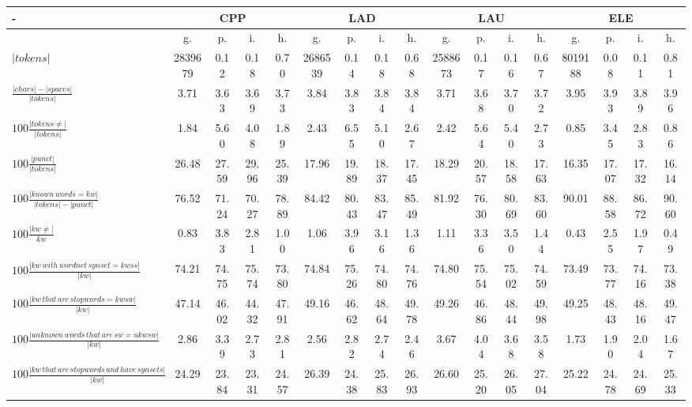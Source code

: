 \documentclass[%
 aip,
 jmp,%
 amsmath,amssymb,
 reprint,%
]{revtex4-1}
\begin{document}
\begin{table}
  \centering
    \footnotesize
\setlength{\tabcolsep}{.056667em}
  \begin{tabular}{|l|| c|c|c|c||  c|c|c|c||   c|c|c|c||   c|c|c|c|}\hline
-\-  & \multicolumn{4}{c|}{CPP} & \multicolumn{4}{c|}{LAD} & \multicolumn{4}{c|}{LAU} & \multicolumn{4}{c|}{ELE} \\ \hline
 & g. & p. & i. & h. &     g. & p. & i. & h. &    g. & p. & i. & h. &    g. & p. & i. & h. \\\hline
$|tokens|$ & 2839679  & 0.12 & 0.18 & 0.70 & 2686539  & 0.14 & 0.18 & 0.68 & 2588673  & 0.17 & 0.16 & 0.67 & 8019188  & 0.08 & 0.11 & 0.81 \\\hline
$\frac{|chars|-|spaces|}{|tokens|}$ & 3.71 & 3.63 & 3.69 & 3.73 & 3.84 & 3.83 & 3.84 & 3.84 & 3.71 & 3.68 & 3.70 & 3.72 & 3.95 & 3.93 & 3.89 & 3.96 \\\hline
$100\frac{|tokens \neq|}{|tokens|}$ & 1.84 & 5.60 & 4.08 & 1.89 & 2.43 & 6.55 & 5.10 & 2.67 & 2.42 & 5.64 & 5.40 & 2.73 & 0.85 & 3.45 & 2.83 & 0.86 \\\hline
$100\frac{|punct|}{|tokens|}$ & 26.48 & 27.59 & 29.96 & 25.39 & 17.96 & 19.89 & 18.37 & 17.45 & 18.29 & 20.57 & 18.58 & 17.63 & 16.35 & 17.07 & 17.32 & 16.14 \\\hline
$100\frac{|known\,words=kw|}{|tokens| - |punct|}$ & 76.52 & 71.24 & 70.27 & 78.89 & 84.42 & 80.43 & 83.47 & 85.49 & 81.92 & 76.30 & 80.69 & 83.60 & 90.01 & 88.58 & 86.72 & 90.60 \\\hline
$100\frac{|kw\neq|}{kw}$ & 0.83 & 3.83 & 2.81 & 1.00 & 1.06 & 3.96 & 3.16 & 1.36 & 1.11 & 3.36 & 3.50 & 1.44 & 0.43 & 2.55 & 1.97 & 0.49 \\\hline
$100\frac{|kw\,with\,wordnet\,synset=kwss|}{|kw|}$ & 74.21 & 74.75 & 75.74 & 73.80 & 74.84 & 75.26 & 74.80 & 74.76 & 74.80 & 75.54 & 75.02 & 74.59 & 73.49 & 73.77 & 74.16 & 73.38 \\\hline
100$\frac{|kw\,that\,are\,stopwords=kwsw|}{|kw|}$ & 47.14 & 46.02 & 44.32 & 47.91 & 49.16 & 46.62 & 48.64 & 49.78 & 49.26 & 46.86 & 48.44 & 49.98 & 49.25 & 48.43 & 48.16 & 49.47 \\\hline
$100\frac{|unknown\,words\,that\,are\,sw=ukwsw|}{|kw|}$ & 2.86 & 3.39 & 2.73 & 2.81 & 2.56 & 2.82 & 2.74 & 2.46 & 3.67 & 4.04 & 3.68 & 3.58 & 1.73 & 1.90 & 2.04 & 1.67 \\\hline
$100\frac{|kw\,that\, are\, stopwords\,and\,have\,synsets|}{|kw|}$ & 24.29 & 23.84 & 23.31 & 24.57 & 26.39 & 24.38 & 25.83 & 26.93 & 26.60 & 25.20 & 26.05 & 27.04 & 25.22 & 24.78 & 24.69 & 25.33 \\\hline

\end{tabular}
\end{table}
\end{document}
